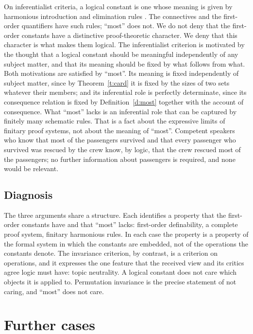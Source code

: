 \documentclass{situationist-preprint}
\begin{document}
On inferentialist criteria, a logical constant is one whose meaning is given by harmonious introduction and elimination rules \citep{Prawitz1965,Dummett1991,Hacking1979}. The connectives and the first-order quantifiers have such rules; \enquote{most} does not. We do not deny that the first-order constants have a distinctive proof-theoretic character. We deny that this character is what makes them logical. The inferentialist criterion is motivated by the thought that a logical constant should be meaningful independently of any subject matter, and that its meaning should be fixed by what follows from what. Both motivations are satisfied by \enquote{most}. Its meaning is fixed independently of subject matter, since by Theorem~\ref{t:card} it is fixed by the sizes of two sets whatever their members; and its inferential role is perfectly determinate, since its consequence relation is fixed by Definition~\ref{d:most} together with the account of consequence. What \enquote{most} lacks is an inferential role that can be captured by finitely many schematic rules. That is a fact about the expressive limits of finitary proof systems, not about the meaning of \enquote{most}. Competent speakers who know that most of the passengers survived and that every passenger who survived was rescued by the crew know, by logic, that the crew rescued most of the passengers; no further information about passengers is required, and none would be relevant.

\subsection{Diagnosis}

The three arguments share a structure. Each identifies a property that the first-order constants have and that \enquote{most} lacks: first-order definability, a complete proof system, finitary harmonious rules. In each case the property is a property of the formal system in which the constants are embedded, not of the operations the constants denote. The invariance criterion, by contrast, is a criterion on operations, and it expresses the one feature that the received view and its critics agree logic must have: topic neutrality. A logical constant does not care which objects it is applied to. Permutation invariance is the precise statement of not caring, and \enquote{most} does not care.

\section{Further cases}\label{s:cases}
\end{document}
